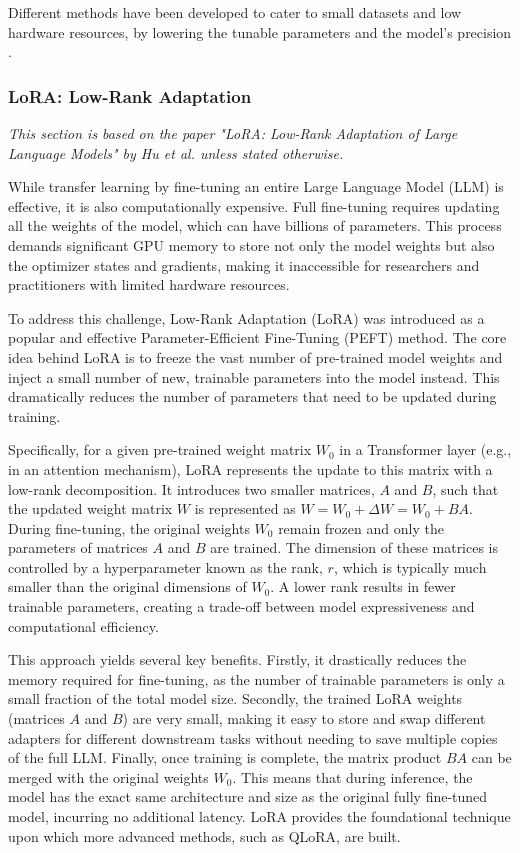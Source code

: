 Different methods have been developed to cater to small datasets and low hardware resources, by lowering the tunable parameters and the model's precision \cite{parthasarathy2024ultimate}.

\subsubsection{LoRA: Low-Rank Adaptation}
\textit{This section is based on the paper "LoRA: Low-Rank Adaptation of Large Language Models" by Hu et al. \cite{hu2021lora} unless stated otherwise.}

While transfer learning by fine-tuning an entire Large Language Model (LLM) is effective, it is also computationally expensive. 
Full fine-tuning requires updating all the weights of the model, which can have billions of parameters. This process demands significant GPU memory to store not only the model weights but also the optimizer states and gradients, making it inaccessible for researchers and practitioners with limited hardware resources.

To address this challenge, Low-Rank Adaptation (LoRA) was introduced as a popular and effective Parameter-Efficient Fine-Tuning (PEFT) method. 
The core idea behind LoRA is to freeze the vast number of pre-trained model weights and inject a small number of new, trainable parameters into the model instead. 
This dramatically reduces the number of parameters that need to be updated during training.

Specifically, for a given pre-trained weight matrix \(W_0\) in a Transformer layer (e.g., in an attention mechanism), LoRA represents the update to this matrix with a low-rank decomposition. 
It introduces two smaller matrices, \(A\) and \(B\), such that the updated weight matrix \(W\) is represented as \(W = W_0 + \Delta W = W_0 + BA\). 
During fine-tuning, the original weights \(W_0\) remain frozen and only the parameters of matrices \(A\) and \(B\) are trained. 
The dimension of these matrices is controlled by a hyperparameter known as the rank, \(r\), which is typically much smaller than the original dimensions of \(W_0\). 
A lower rank results in fewer trainable parameters, creating a trade-off between model expressiveness and computational efficiency.

This approach yields several key benefits. Firstly, it drastically reduces the memory required for fine-tuning, as the number of trainable parameters is only a small fraction of the total model size. Secondly, the trained LoRA weights (matrices \(A\) and \(B\)) are very small, making it easy to store and swap different adapters for different downstream tasks without needing to save multiple copies of the full LLM. Finally, once training is complete, the matrix product \(BA\) can be merged with the original weights \(W_0\). This means that during inference, the model has the exact same architecture and size as the original fully fine-tuned model, incurring no additional latency. LoRA provides the foundational technique upon which more advanced methods, such as QLoRA, are built.
